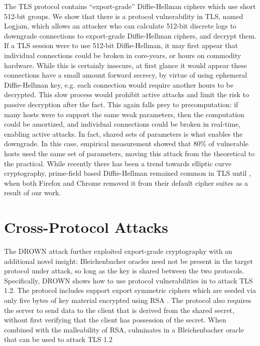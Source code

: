 The TLS protocol contains ``export-grade'' Diffie-Hellman ciphers which use
short 512-bit groups. We show that there is a protocol vulnerability in TLS,
named Logjam, which allows an attacker who can calculate 512-bit discrete logs
to downgrade connections to export-grade Diffie-Hellman ciphers, and decrypt
them. If a TLS session were to use 512-bit Diffie-Hellman, it may first appear
that individual connections could be broken in \TK core-years, or \TK hours on
commodity hardware. While this is certainly insecure, at first glance it would
appear these connections have a small amount forward secrecy, by virtue of
using ephemeral Diffie-Hellman key, e.g. each connection would require another
\TK hours to be decrypted. This slow process would prohibit active attacks and
limit the risk to passive decryption after the fact. This again falls prey to
precomputation: if many hosts were to support the same weak parameters, then
the computation could be amortized, and individual connections could be broken
in real-time, enabling active attacks. In fact, shared sets of parameters is
what enables the downgrade. In this case, empirical measurement showed that
80\% of vulnerable hosts used the same set of parameters, moving this attack
from the theoretical to the practical. While recently there has been a trend
towards elliptic curve cryptography, prime-field based Diffie-Hellman remained
common in TLS until \TK, when both Firefox and Chrome removed it from their
default cipher suites as a result of our work.

\section{Cross-Protocol Attacks}

The DROWN attack further exploited export-grade cryptography with an additional
novel insight: Bleichenbacher oracles need not be present in the target
protocol under attack, so long as the key is shared between the two protocols.
Specifically, DROWN shows how to use protocol vulnerabilities in \ssltwo to
attack TLS 1.2. The \ssltwo protocol includes support export symmetric ciphers
which are seeded via only five bytes of key material encrypted using RSA \PKCS.
The \ssltwo protocol also requires the server to send data to the client that is
derived from the shared secret, without first verifying that the client has
possession of the secret. When combined with the malleability of RSA,
culminates in a Bleichenbacher oracle that can be used to attack TLS 1.2

